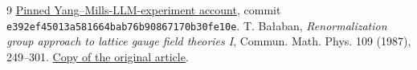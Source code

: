 \documentclass[11pt]{article}
\theoremstyle{remark}
\begin{document}
\begin{thebibliography}{9}
\href{https://github.com/ethanwsussman/Yang--Mills-LLM-experiment/tree/e392ef45013a581664bab76b90867170b30fe10e}
{Pinned Yang--Mills-LLM-experiment account}, commit
\texttt{e392ef45013a581664bab76b90867170b30fe10e}.
 T. Ba\l aban,
\emph{Renormalization group approach to lattice gauge field theories I},
Commun. Math. Phys. 109 (1987), 249--301.
\href{https://scispace.com/pdf/renormalization-group-approach-to-lattice-gauge-field-3ygai0vxt1.pdf}
{Copy of the original article}.
\end{thebibliography}
\end{document}
